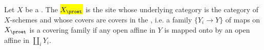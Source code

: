 \begin{definition} \label{definition:pro_etale_site_of_a_scheme}
    Let $X$ be a . The  \hl{$X_{\proet}$} is the site whose underlying category is the category of  $X$-schemes and whose covers are covers in the , i.e. a family $\{Y_i \to Y\}$ of maps on $X_{\proet}$ is a covering family if any open affine in $Y$ is mapped onto by an open affine in $\coprod_i Y_i$. 
\end{definition}